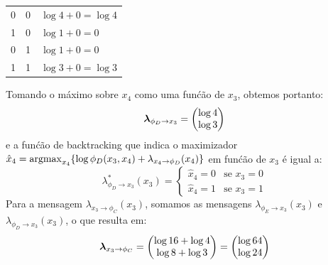 \begin{exenumerate}
\begin{solution}
\begin{center}
\begin{tabular}{lll}
                0 & 0 &  $\log 4 + 0 = \log 4$ \\
                1 & 0 &  $\log 1 + 0 = 0$\\
                0 & 1 &  $\log 1 + 0 = 0$\\
                1 & 1 &  $\log 3 + 0 = \log 3$ \\
                \bottomrule
            \end{tabular}
        \end{center}
        Tomando o m\'aximo sobre $x_4$ como uma fun\'c\~ao de $x_3$, obtemos portanto:
        \begin{equation}
            \boldsymbol{\lambda}_{\phi_D \to x_3} = \begin{pmatrix}
                \log 4\\
                \log 3
            \end{pmatrix}
        \end{equation}
        e a fun\'c\~ao de backtracking que indica o maximizador
        $\hat{x}_4 = \operatorname*{\mathrm{argmax}}_{x_4} \{ \log \phi_D(x_3, x_4) + \lambda_{x_4 \to \phi_D}(x_4) \}$ em fun\'c\~ao de $x_3$ \'e igual a:
        \begin{equation}
            \lambda^*_{\phi_D \to x_3}(x_3) = \begin{cases}
                \hat{x}_4=0 & \text{se } x_3= 0\\
                \hat{x}_4=1 & \text{se } x_3= 1
            \end{cases}
        \end{equation}
        Para a mensagem $\lambda_{x_3 \to \phi_C}(x_3)$, somamos as
        mensagens $\lambda_{\phi_E \to x_3}(x_3)$ e
        $\lambda_{\phi_D \to x_3}(x_3)$, o que resulta em:
        \begin{equation}
            \boldsymbol{\lambda}_{ x_3 \to \phi_C} = \begin{pmatrix}
                \log 16 + \log 4\\
                \log 8 + \log 3\\
            \end{pmatrix}
            =\begin{pmatrix}
                \log 64\\
                \log 24\\
            \end{pmatrix}
        \end{equation}
        

\end{solution}
\end{exenumerate}
